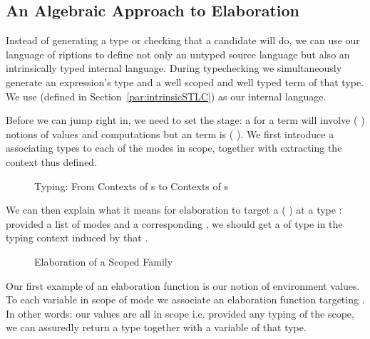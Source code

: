 \subsection{An Algebraic Approach to Elaboration}\label{section:elaboration}

Instead of generating a type or checking that a candidate will do, we
can use our language of riptions to define not only an
untyped source language but also an intrinsically typed internal
language. During typechecking we simultaneously generate an
expression's type and a well scoped and well typed term of that
type. We use  (defined in Section~\ref{par:intrinsicSTLC}) as
our internal language.

Before we can jump right in, we need to set the stage: a  for a
 term will involve ({ }) notions of values and
computations but an  term is ({ }). We first
introduce a  associating types to each of the modes in scope, together
with  extracting the context thus defined.

\begin{figure}[h]
\begin{minipage}[t]{0.4\textwidth}
\end{minipage}
\begin{minipage}[t]{0.5\textwidth}
\end{minipage}
\caption{Typing: From Contexts of s to Contexts of s\label{fig:typingmodes}}
\end{figure}

We can then explain what it means for elaboration to target  a
({ }) at a type : provided a list of modes and a
corresponding , we should get a  of type  in the
typing context induced by that .

\begin{figure}[h]
\caption{Elaboration of a Scoped Family}
\end{figure}

Our first example of an elaboration function is our notion of environment values.
To each variable in scope of mode  we associate an elaboration function
targeting . In other words: our values are all in scope i.e. provided any
typing of the scope, we can assuredly return a type together with a variable of
that type.


